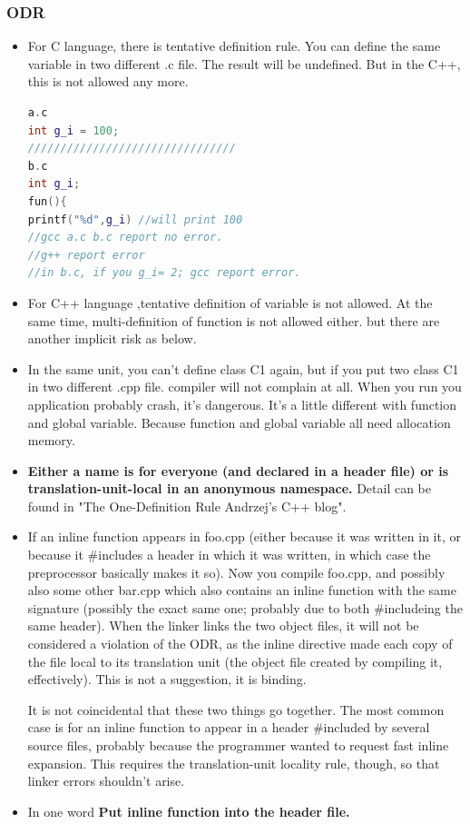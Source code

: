 \documentclass[a4paper,12pt,twoside]{book}
\begin{document}
\subsubsection{ODR}
\begin{itemize}

\item For C language, there is tentative definition rule. You can define the same variable in two different .c file. The result will be undefined. But in the C++, this is not allowed any more. 

\begin{lstlisting}[frame=single, language=c++]
a.c
int g_i = 100;
////////////////////////////////
b.c
int g_i;
fun(){
printf("%d",g_i) //will print 100
//gcc a.c b.c report no error.
//g++ report error
//in b.c, if you g_i= 2; gcc report error.
\end{lstlisting}

\item For C++ language ,tentative definition of variable is not allowed. At the same time, multi-definition of function is not allowed either. but there are another implicit risk as below. 

\item In the same unit, you can't define class C1 again, but if you put two class C1 in two different .cpp file. compiler will not complain at all. When you run you application probably crash, it's dangerous. It's a little different with function and global variable. Because function and global variable all need allocation memory.

\item \textbf{Either a name is for everyone (and declared in a header file) or is translation-unit-local in an anonymous namespace.} Detail can be found in "The One-Definition Rule  Andrzej's C++ blog".

\item  If an inline function appears in foo.cpp (either because it was written in it, or because it \#includes a header in which it was written, in which case the preprocessor basically makes it so). Now you compile foo.cpp, and possibly also some other bar.cpp which also contains an inline function with the same signature (possibly the exact same one; probably due to both \#includeing the same header). When the linker links the two object files, it will not be considered a violation of the ODR, as the inline directive made each copy of the file local to its translation unit (the object file created by compiling it, effectively). This is not a suggestion, it is binding.

It is not coincidental that these two things go together. The most common case is for an inline function to appear in a header \#included by several source files, probably because the programmer wanted to request fast inline expansion. This requires the translation-unit locality rule, though, so that linker errors shouldn't arise.

\item In one word \textbf{Put inline function into the header file.}
\end{itemize}
\end{document}
